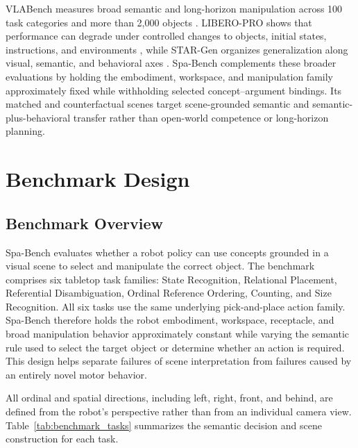 \documentclass[conference]{IEEEtran}
\begin{document}
VLABench measures broad semantic and long-horizon manipulation across
100 task categories and more than 2,000 objects
\cite{zhang2024vlabench}. LIBERO-PRO shows that performance can degrade
under controlled changes to objects, initial states, instructions, and
environments \cite{zhou2025liberopro}, while STAR-Gen organizes
generalization along visual, semantic, and behavioral axes
\cite{gao2026stargen}. Spa-Bench complements these broader evaluations by
holding the embodiment, workspace, and manipulation family approximately
fixed while withholding selected concept--argument bindings. Its matched
and counterfactual scenes target scene-grounded semantic and
semantic-plus-behavioral transfer rather than open-world competence or
long-horizon planning.

\section{Benchmark Design}
\label{sec:benchmark_design}

\subsection{Benchmark Overview}

Spa-Bench evaluates whether a robot policy can use concepts grounded in a visual scene to select and manipulate the correct object. The benchmark comprises six tabletop task families: State Recognition, Relational Placement, Referential Disambiguation, Ordinal Reference Ordering, Counting, and Size Recognition. All six tasks use the same underlying pick-and-place action family. Spa-Bench therefore holds the robot embodiment, workspace, receptacle, and broad manipulation behavior approximately constant while varying the semantic rule used to select the target object or determine whether an action is required. This design helps separate failures of scene interpretation from failures caused by an entirely novel motor behavior.

All ordinal and spatial directions, including left, right, front, and behind, are defined from the robot's perspective rather than from an individual camera view. Table~\ref{tab:benchmark_tasks} summarizes the semantic decision and scene construction for each task.
\end{document}
